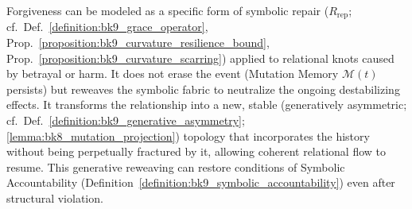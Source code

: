 \begin{scholium}
\label{scholium:bk9_forgiveness_as_reweaving}
Forgiveness can be modeled as a specific form of symbolic repair ($R_{\text{rep}}$; cf.~Def.~\ref{definition:bk9_grace_operator}, Prop.~\ref{proposition:bk9_curvature_resilience_bound}, Prop.~\ref{proposition:bk9_curvature_scarring}) applied to relational knots caused by betrayal or harm. It does not erase the event (Mutation Memory $\mathcal{M}(t)$ persists) but reweaves the symbolic fabric to neutralize the ongoing destabilizing effects. It transforms the relationship into a new, stable (generatively asymmetric; cf.~Def.~\ref{definition:bk9_generative_asymmetry}; \ref{lemma:bk8_mutation_projection}) topology that incorporates the history without being perpetually fractured by it, allowing coherent relational flow to resume. This generative reweaving can restore conditions of Symbolic Accountability (Definition~\ref{definition:bk9_symbolic_accountability}) even after structural violation.
\end{scholium}
